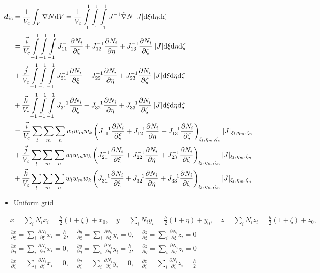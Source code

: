 \documentclass[11pt]{article}
\def\bbf#1{\mathchoice{\hbox{\boldmath$\displaystyle#1$}}
{\hbox{\boldmath$\textstyle#1$}} {\hbox{\boldmath$\scriptstyle#1$}} {\hbox{\boldmath$\scriptscriptstyle#1$}} }
\newcommand{\Vc}{V_c}
\newcommand{\dic}{\bbf{d}_{ic}}
\newcommand{\xxi}{\frac{\partial x}{\partial \xi}}
\newcommand{\yxi}{\frac{\partial y}{\partial \xi}}
\newcommand{\zxi}{\frac{\partial z}{\partial \xi}}
\newcommand{\xeta}{\frac{\partial x}{\partial \eta}}
\newcommand{\yeta}{\frac{\partial y}{\partial \eta}}
\newcommand{\zeeta}{\frac{\partial z}{\partial \eta}}
\newcommand{\xzeta}{\frac{\partial x}{\partial \zeta}}
\newcommand{\yzeta}{\frac{\partial y}{\partial \zeta}}
\newcommand{\zzeta}{\frac{\partial z}{\partial \zeta}}
\newcommand{\nixi}{\frac{\partial N_i}{\partial \xi}}
\newcommand{\nieta}{\frac{\partial N_i}{\partial \eta}}
\newcommand{\nizeta}{\frac{\partial N_i}{\partial \zeta}}
\newcommand{\md}{\mbox{d}}
\newcommand{\Int}{\int\limits}
\begin{document}
\begin{enumerate}
	\begin{align*}
	\dic &= \frac{1}{\Vc}\int_V \nabla N \md V 
	= \frac{1}{\Vc} \Int_{-1}^{1}\Int_{-1}^{1}\Int_{-1}^{1} J^{-1} \tilde{\nabla} N\;  |J|\md \xi \md \eta \md \zeta \\
	&= \frac{\vec i}{\Vc} \Int_{-1}^{1}\Int_{-1}^{1}\Int_{-1}^{1} J_{11}^{-1}\nixi  + J_{12}^{-1}\nieta + J_{13}^{-1}\nizeta\; |J| \md \xi \md \eta \md \zeta \\
	&+ \frac{\vec j}{\Vc} \Int_{-1}^{1}\Int_{-1}^{1}\Int_{-1}^{1} J_{21}^{-1}\nixi  + J_{22}^{-1}\nieta + J_{23}^{-1}\nizeta\; |J| \md \xi \md \eta \md \zeta \\
	&+ \frac{\vec k}{\Vc} \Int_{-1}^{1}\Int_{-1}^{1}\Int_{-1}^{1} J_{31}^{-1}\nixi  + J_{32}^{-1}\nieta + J_{33}^{-1}\nizeta\; |J| \md \xi \md \eta \md \zeta \\
	&= \frac{\vec i}{\Vc} \sum_l \sum_m \sum_n w_l w_m w_k \left( J_{11}^{-1}\nixi  + J_{12}^{-1}\nieta + J_{13}^{-1}\nizeta \right)_{\xi_l, \eta_m, \zeta_n} |J|_{\xi_l, \eta_m, \zeta_n} \\
	&+ \frac{\vec j}{\Vc} \sum_l \sum_m \sum_n w_l w_m w_k \left( J_{21}^{-1}\nixi  + J_{22}^{-1}\nieta + J_{23}^{-1}\nizeta \right)_{\xi_l, \eta_m, \zeta_n} |J|_{\xi_l, \eta_m, \zeta_n} \\
	&+ \frac{\vec k}{\Vc} \sum_l \sum_m \sum_n w_l w_m w_k \left( J_{31}^{-1}\nixi  + J_{32}^{-1}\nieta + J_{33}^{-1}\nizeta \right)_{\xi_l, \eta_m, \zeta_n} |J|_{\xi_l, \eta_m, \zeta_n} \\
	\end{align*}
	
	\clearpage
	\begin{itemize}
		\item Uniform grid
	\end{itemize}
	
	\begin{align*}
	&x = \sum_i N_i x_i= \frac{h}{2}(1+\xi) + x_0, \quad  y= \sum_i N_i y_i = \frac{h}{2}(1+\eta) + y_0, \quad z = \sum_i N_i z_i = \frac{h}{2}(1+\zeta) + z_0,\\
	&\xxi = \sum_i \nixi x_i = \frac{h}{2}, \quad \yxi= \sum_i \nixi y_i = 0, \quad \zxi = \sum_i \nixi z_i = 0\\
	&\xeta = \sum_i \nieta x_i = 0, \quad \yeta= \sum_i \nieta y_i = \frac{h}{2}, \quad \zeeta = \sum_i \nieta z_i = 0 \\
	&\xzeta = \sum_i \nizeta x_i = 0, \quad \yzeta= \sum_i \nizeta y_i = 0, \quad \zzeta = \sum_i \nizeta z_i = \frac{h}{2}
	\end{align*}
	

\end{enumerate}
\end{document}
